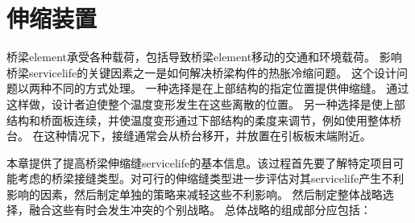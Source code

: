 \chapter{伸缩装置}
\label{chp:expansion-devices}
桥梁\gls*{element}承受各种载荷，包括导致桥梁\gls*{element}移动的交通和环境载荷。 影响桥梁\gls*{servicelife}的关键因素之一是如何解决桥梁构件的热胀冷缩问题。 这个设计问题以两种不同的方式处理。 一种选择是在上部结构的指定位置提供伸缩缝。 通过这样做，设计者迫使整个温度变形发生在这些离散的位置。 另一种选择是使上部结构和桥面板连续，并使温度变形通过下部结构的柔度来调节，例如使用整体桥台。 在这种情况下，接缝通常会从桥台移开，并放置在引板板末端附近。

本章提供了提高桥梁伸缩缝\gls*{servicelife}的基本信息。该过程首先要了解特定项目可能考虑的桥梁接缝类型。对可行的伸缩缝类型进一步评估对其\gls*{servicelife}产生不利影响的因素，然后制定单独的策略来减轻这些不利影响。 然后制定整体战略选择，融合这些有时会发生冲突的个别战略。 总体战略的组成部分应包括：

